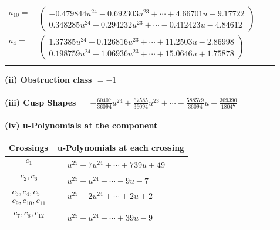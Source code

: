 \documentclass[1p]{elsarticle_modified}
\theoremstyle{definition}
\begin{document}
\begin{tabular}{m{7pt} m{180pt} m{7pt} m{180pt} }
\flushright $a_{10}=$&$\begin{pmatrix}-0.479844 u^{24}-0.692303 u^{23}+\cdots+4.66701 u-9.17722\\0.348285 u^{24}+0.294232 u^{23}+\cdots-0.412423 u-4.84612\end{pmatrix}$ \\
\flushright $a_{4}=$&$\begin{pmatrix}1.37385 u^{24}-0.126816 u^{23}+\cdots+11.2503 u-2.86998\\0.198759 u^{24}-1.06936 u^{23}+\cdots+15.0646 u+1.75878\end{pmatrix}$\\&\end{tabular}
\flushleft \textbf{(ii) Obstruction class $= -1$}\\~\\
\flushleft \textbf{(iii) Cusp Shapes $= -\frac{60407}{36094} u^{24}+\frac{67585}{36094} u^{23}+\cdots-\frac{588579}{36094} u+\frac{309390}{18047}$}\\~\\
\newpage\renewcommand{\arraystretch}{1}
\flushleft \textbf{(iv) u-Polynomials at the component}\newline \\
\begin{tabular}{m{50pt}|m{274pt}}
Crossings & \hspace{64pt}u-Polynomials at each crossing \\
\hline $$\begin{aligned}c_{1}\end{aligned}$$&$\begin{aligned}
&u^{25}+7 u^{24}+\cdots+739 u+49
\end{aligned}$\\
\hline $$\begin{aligned}c_{2},c_{6}\end{aligned}$$&$\begin{aligned}
&u^{25}- u^{24}+\cdots-9 u-7
\end{aligned}$\\
\hline $$\begin{aligned}c_{3},c_{4},c_{5}\\c_{9},c_{10},c_{11}\end{aligned}$$&$\begin{aligned}
&u^{25}+2 u^{24}+\cdots+2 u+2
\end{aligned}$\\
\hline $$\begin{aligned}c_{7},c_{8},c_{12}\end{aligned}$$&$\begin{aligned}
&u^{25}+u^{24}+\cdots+39 u-9
\end{aligned}$\\
\hline
\end{tabular}\\~\\
\end{document}
